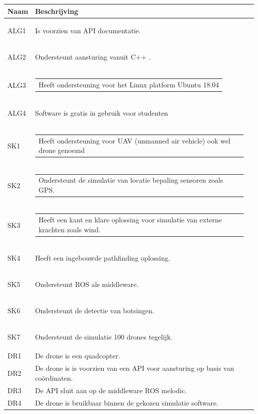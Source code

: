 \documentclass[a4paper, 11pt, oneside]{report}
\begin{document}
\begin{longtable}{|l|l|l|}
	\hline
	\rowcolor[HTML]{C0C0C0} 
	Naam & Beschrijving \\ \hline
	\endhead
		\hypertarget{alg1}{ALG1}	&Is voorzien van API documentatie.        \\ \hline
		\hypertarget{alg2}{ALG2}	&Ondersteunt aansturing vanuit C++ .    \\ \hline
		\hypertarget{alg3}{ALG3}	&\begin{tabular}[c]{@{}l@{}}Heeft ondersteuning voor het Linux platform Ubuntu 18.04\end{tabular}        \\ \hline
		\hypertarget{alg4}{ALG4}	&Software is gratis in gebruik voor studenten        \\ \hline
		\hypertarget{sk1}{SK1}		&\begin{tabular}[c]{@{}l@{}}Heeft ondersteuning voor UAV (unmanned air vehicle) ook wel drone genoemd\end{tabular} \\ \hline
		\hypertarget{sk2}{SK2}		&\begin{tabular}[c]{@{}l@{}}Ondersteunt de simulatie van locatie bepaling sensoren zoals GPS.\end{tabular}        \\ \hline
		\hypertarget{sk3}{SK3}		&\begin{tabular}[c]{@{}l@{}}Heeft een kant en klare oplossing voor simulatie van externe krachten zoals wind.\end{tabular}        \\ \hline
		\hypertarget{sk4}{SK4}		& Heeft een ingebouwde pathfinding oplossing.        \\ \hline
		\hypertarget{sk5}{SK5}		& Ondersteunt ROS als middleware.        \\ \hline
		\hypertarget{sk6}{SK6}		& Ondersteunt de detectie van botsingen.        \\ \hline
		\hypertarget{sk7}{SK7}		& Ondersteunt de simulatie 100 drones tegelijk.        \\ \hline
		DR1		& De drone is een quadcopter.        \\ \hline
		DR2		& De drone is is voorzien van een API voor aansturing op basis van coördinaten.       \\ \hline
		DR3		& De API sluit aan op de middleware ROS melodic.        \\ \hline
		DR4		& De drone is bruikbaar binnen de gekozen simulatie software.        \\ \hline%

\end{longtable}
\end{document}

